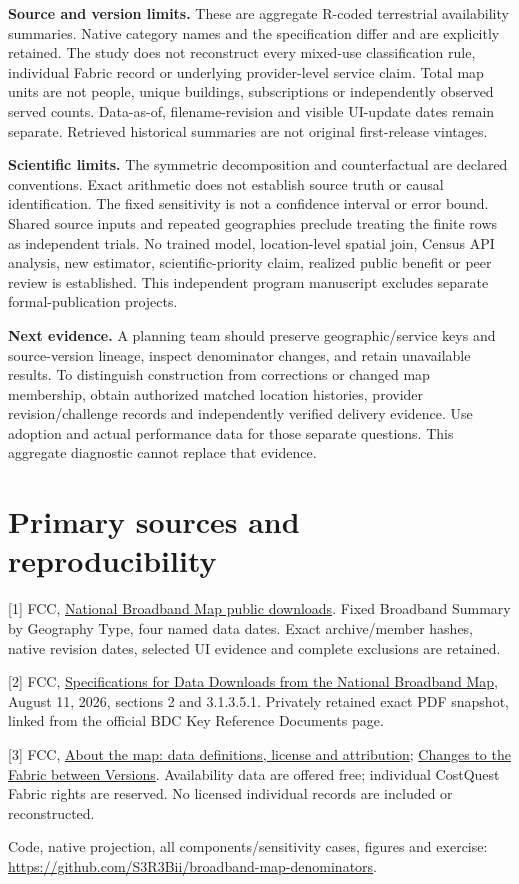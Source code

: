 \documentclass[10pt,letterpaper]{article}
\begin{document}
\textbf{Source and version limits.} These are aggregate R-coded terrestrial availability summaries. Native category names and the specification differ and are explicitly retained. The study does not reconstruct every mixed-use classification rule, individual Fabric record or underlying provider-level service claim. Total map units are not people, unique buildings, subscriptions or independently observed served counts. Data-as-of, filename-revision and visible UI-update dates remain separate. Retrieved historical summaries are not original first-release vintages.

\textbf{Scientific limits.} The symmetric decomposition and counterfactual are declared conventions. Exact arithmetic does not establish source truth or causal identification. The fixed sensitivity is not a confidence interval or error bound. Shared source inputs and repeated geographies preclude treating the finite rows as independent trials. No trained model, location-level spatial join, Census API analysis, new estimator, scientific-priority claim, realized public benefit or peer review is established. This independent program manuscript excludes separate formal-publication projects.

\textbf{Next evidence.} A planning team should preserve geographic/service keys and source-version lineage, inspect denominator changes, and retain unavailable results. To distinguish construction from corrections or changed map membership, obtain authorized matched location histories, provider revision/challenge records and independently verified delivery evidence. Use adoption and actual performance data for those separate questions. This aggregate diagnostic cannot replace that evidence.

\section*{Primary sources and reproducibility}
\small
[1] FCC, \href{https://broadbandmap.fcc.gov/data-download}{National Broadband Map public downloads}. Fixed Broadband Summary by Geography Type, four named data dates. Exact archive/member hashes, native revision dates, selected UI evidence and complete exclusions are retained.

[2] FCC, \href{https://us-fcc.app.box.com/v/bdc-data-downloads-output}{Specifications for Data Downloads from the National Broadband Map}, August 11, 2026, sections 2 and 3.1.3.5.1. Privately retained exact PDF snapshot, linked from the official BDC Key Reference Documents page.

[3] FCC, \href{https://broadbandmap.fcc.gov/about?version=jun2026}{About the map: data definitions, license and attribution}; \href{https://help.bdc.fcc.gov/hc/en-us/articles/12382207389083-Changes-to-the-Fabric-between-Versions}{Changes to the Fabric between Versions}. Availability data are offered free; individual CostQuest Fabric rights are reserved. No licensed individual records are included or reconstructed.

Code, native projection, all components/sensitivity cases, figures and exercise: \url{https://github.com/S3R3Bii/broadband-map-denominators}.
\end{document}
